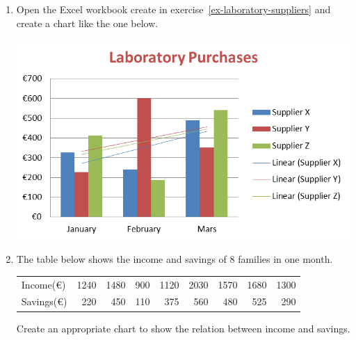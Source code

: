 \begin{enumerate}[leftmargin=*,resume]
\item Open the Excel workbook create in exercise~\ref{ex-laboratory-suppliers} and create a chart like the one below. 
\begin{center}
\includegraphics[scale=0.8]{img/laboratory-suppliers}
\end{center}

\item The table below shows the income and savings of 8 families in one month.
\begin{center}
\begin{tabular}{lrrrrrrrr}
\toprule
Income(€)  & 1240 & 1480 & 900 & 1120 & 2030 & 1570 & 1680 & 1300\\
Savings(€) &  220 &  450 & 110 &  375 &  560 &  480 &  525 &  290\\
\bottomrule
\end{tabular}
\end{center}
Create an appropriate chart to show the relation between income and savings. 
\end{enumerate}